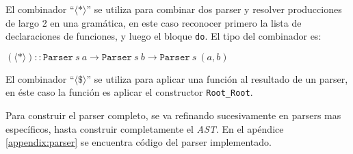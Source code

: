   El combinador ``$\langle * \rangle$'' \cite{uuparsing:piriapolis} se utiliza para
  combinar dos parser y resolver producciones de largo 2 en una gramática,
  en este caso reconocer primero la lista de declaraciones de funciones, y
  luego el bloque \texttt{do}.
  El tipo del combinador es:

  \begin{center}
    $(\langle*\rangle) :: \texttt{Parser}\ s\ a \rightarrow \texttt{Parser}\ s\ b \rightarrow \texttt{Parser}\ s\ (a, b)$
  \end{center}

  El combinador ``$\langle \$ \rangle$'' se utiliza para aplicar una
función al resultado de un parser, en éste caso la función es aplicar
el constructor \texttt{Root\_Root}.

  Para construir el parser completo, se va refinando sucesivamente
en parsers mas específicos, hasta construir completamente el \emph{AST}.
  En el apéndice \ref{appendix:parser} se encuentra código del parser
implementado.

